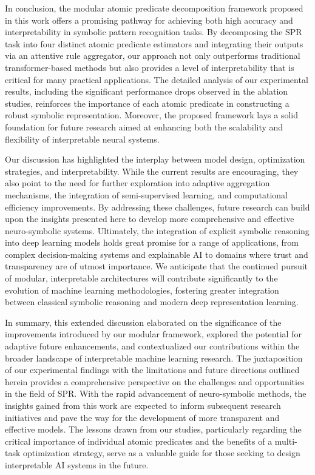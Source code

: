 \documentclass{article}
\begin{document}
In conclusion, the modular atomic predicate decomposition framework proposed in this work offers a promising pathway for achieving both high accuracy and interpretability in symbolic pattern recognition tasks. By decomposing the SPR task into four distinct atomic predicate estimators and integrating their outputs via an attentive rule aggregator, our approach not only outperforms traditional transformer-based methods but also provides a level of interpretability that is critical for many practical applications. The detailed analysis of our experimental results, including the significant performance drops observed in the ablation studies, reinforces the importance of each atomic predicate in constructing a robust symbolic representation. Moreover, the proposed framework lays a solid foundation for future research aimed at enhancing both the scalability and flexibility of interpretable neural systems. 

Our discussion has highlighted the interplay between model design, optimization strategies, and interpretability. While the current results are encouraging, they also point to the need for further exploration into adaptive aggregation mechanisms, the integration of semi-supervised learning, and computational efficiency improvements. By addressing these challenges, future research can build upon the insights presented here to develop more comprehensive and effective neuro-symbolic systems. Ultimately, the integration of explicit symbolic reasoning into deep learning models holds great promise for a range of applications, from complex decision-making systems and explainable AI to domains where trust and transparency are of utmost importance. We anticipate that the continued pursuit of modular, interpretable architectures will contribute significantly to the evolution of machine learning methodologies, fostering greater integration between classical symbolic reasoning and modern deep representation learning.

In summary, this extended discussion elaborated on the significance of the improvements introduced by our modular framework, explored the potential for adaptive future enhancements, and contextualized our contributions within the broader landscape of interpretable machine learning research. The juxtaposition of our experimental findings with the limitations and future directions outlined herein provides a comprehensive perspective on the challenges and opportunities in the field of SPR. With the rapid advancement of neuro-symbolic methods, the insights gained from this work are expected to inform subsequent research initiatives and pave the way for the development of more transparent and effective models. The lessons drawn from our studies, particularly regarding the critical importance of individual atomic predicates and the benefits of a multi-task optimization strategy, serve as a valuable guide for those seeking to design interpretable AI systems in the future.
\end{document}
